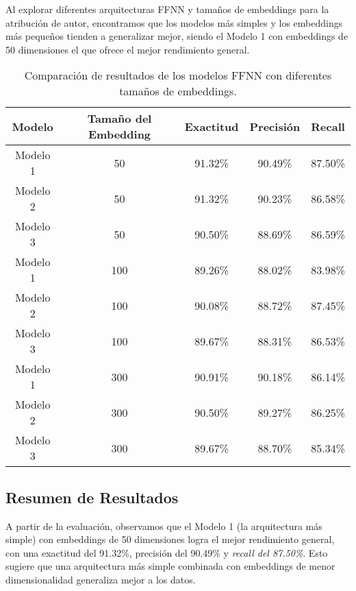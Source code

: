 \documentclass[11pt,english]{article}
\theoremstyle{plain}
\begin{document}
Al explorar diferentes arquitecturas FFNN y tamaños de embeddings para la atribución de autor, encontramos que los modelos más simples y los embeddings más pequeños tienden a generalizar mejor, siendo el Modelo 1 con embeddings de 50 dimensiones el que ofrece el mejor rendimiento general.

\begin{table}[h!]
\centering
\begin{tabular}{|c|c|c|c|c|}
\hline
\textbf{Modelo} & \textbf{Tamaño del Embedding} & \textbf{Exactitud} & \textbf{Precisión} & \textbf{Recall} \\ \hline
Modelo 1        & 50                            & 91.32\%            & 90.49\%            & 87.50\%         \\ \hline
Modelo 2        & 50                            & 91.32\%            & 90.23\%            & 86.58\%         \\ \hline
Modelo 3        & 50                            & 90.50\%            & 88.69\%            & 86.59\%         \\ \hline
Modelo 1        & 100                           & 89.26\%            & 88.02\%            & 83.98\%         \\ \hline
Modelo 2        & 100                           & 90.08\%            & 88.72\%            & 87.45\%         \\ \hline
Modelo 3        & 100                           & 89.67\%            & 88.31\%            & 86.53\%         \\ \hline
Modelo 1        & 300                           & 90.91\%            & 90.18\%            & 86.14\%         \\ \hline
Modelo 2        & 300                           & 90.50\%            & 89.27\%            & 86.25\%         \\ \hline
Modelo 3        & 300                           & 89.67\%            & 88.70\%            & 85.34\%         \\ \hline
\end{tabular}
\caption{Comparación de resultados de los modelos FFNN con diferentes tamaños de embeddings.}
\end{table}

\subsection*{Resumen de Resultados}

A partir de la evaluación, observamos que el Modelo 1 (la arquitectura más simple) con embeddings de 50 dimensiones logra el mejor rendimiento general, con una exactitud del 91.32\%, precisión del 90.49\% y \textit{recall del 87.50\%}. Esto sugiere que una arquitectura más simple combinada con embeddings de menor dimensionalidad generaliza mejor a los datos.
\end{document}

